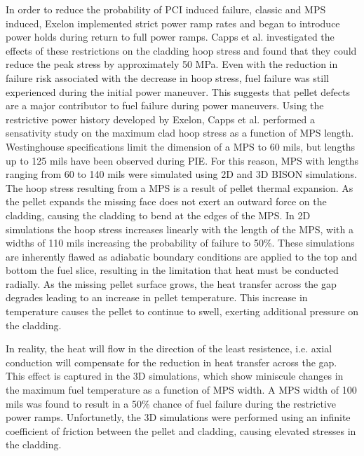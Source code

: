 \documentclass[edeposit,fullpage,12pt]{uiucthesis2009}
\begin{document}
In order to reduce the probability of \gls{PCI} induced failure, classic and \gls{MPS} induced, Exelon implemented strict power ramp rates and began to introduce power holds during return to full power ramps.%
Capps et al. investigated the effects of these restrictions on the cladding hoop stress and found that they could reduce the peak stress by approximately 50 MPa.
Even with the reduction in failure risk associated with the decrease in hoop stress, fuel failure was still experienced during the initial power maneuver.
This suggests that pellet defects are a major contributor to fuel failure during power maneuvers. 
Using the restrictive power history developed by Exelon, Capps et al. performed a sensativity study on the maximum clad hoop stress as a function of \gls{MPS} length.
Westinghouse specifications limit the dimension of a \gls{MPS} to 60 mils, but lengths up to 125 mils have been observed during \gls{PIE}.
For this reason, \gls{MPS} with lengths ranging from 60 to 140 mils were simulated using 2D and 3D BISON simulations. 
The hoop stress resulting from a \gls{MPS} is a result of pellet thermal expansion. 
As the pellet expands the missing face does not exert an outward force on the cladding, causing the cladding to bend at the edges of the \gls{MPS}.
In 2D simulations the hoop stress increases linearly with the length of the \gls{MPS}, with a widths of 110 mils increasing the probability of failure to 50\%.
These simulations are inherently flawed as adiabatic boundary conditions are applied to the top and bottom the fuel slice, resulting in the limitation that heat must be conducted radially.
As the missing pellet surface grows, the heat transfer across the gap degrades leading to an increase in pellet temperature.
This increase in temperature causes the pellet to continue to swell, exerting additional pressure on the cladding.

In reality, the heat will flow in the direction of the least resistence, i.e. axial conduction will compensate for the reduction in heat transfer across the gap.
This effect is captured in the 3D simulations, which show miniscule changes in the maximum fuel temperature as a function of \gls{MPS} width.
A \gls{MPS} width of 100 mils was found to result in a 50\% chance of fuel failure during the restrictive power ramps.
Unfortunetly, the 3D simulations were performed using an infinite coefficient of friction between the pellet and cladding, causing elevated stresses in the cladding.
\end{document}
